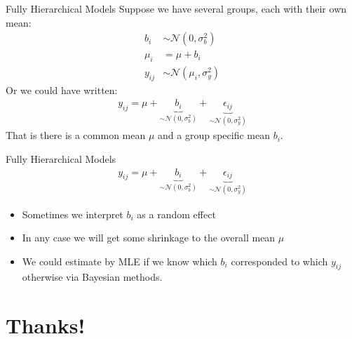 \documentclass[xcolor=pdftex,dvipsnames,table,mathserif,aspectratio=169]{beamer}
\begin{document}
\begin{frame}{Fully Hierarchical Models}
Suppose we have several groups, each with their own mean:
\begin{align*}
b_{i} & \sim \mathcal{N}\left(0, \sigma_{b}^{2}\right) \\
\mu_{i} &=\mu+b_{i} \\
y_{i j} & \sim \mathcal{N}\left(\mu_{i}, \sigma_{y}^{2}\right)
\end{align*}
Or we could have written:
\begin{align*}
y_{i j}=\mu+\underbrace{b_{i}}_{\sim \mathcal{N}\left(0, \sigma_{b}^{2}\right)}+\underbrace{\epsilon_{i j}}_{\sim \mathcal{N}\left(0, \sigma_{y}^{2}\right)}
\end{align*}
That is there is a common mean $\mu$ and a group specific mean $b_i$.
\end{frame}

\begin{frame}{Fully Hierarchical Models}
\begin{align*}
y_{i j}=\mu+\underbrace{b_{i}}_{\sim \mathcal{N}\left(0, \sigma_{b}^{2}\right)}+\underbrace{\epsilon_{i j}}_{\sim \mathcal{N}\left(0, \sigma_{y}^{2}\right)}
\end{align*}
\begin{itemize}
\item Sometimes we interpret $b_i$ as a \alert{random effect}
\item In any case we will get some \alert{shrinkage} to the overall mean $\mu$
\item We could estimate by MLE if we know which $b_i$ corresponded to which $y_{ij}$ otherwise via Bayesian methods.
\end{itemize}
\end{frame}


\section*{Thanks!}
\end{document}
